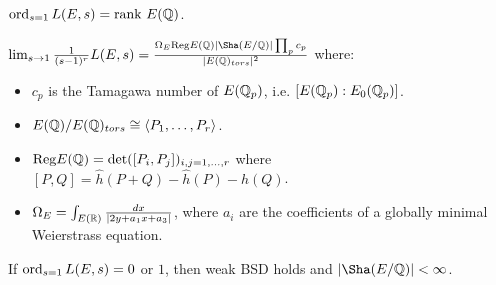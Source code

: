 \documentclass[10pt,a4paper]{article}
\begin{document}
\begin{conjecture}
  $\operatorname{ord}_{s=1} L(E,s) = \text{rank }E(\mathbb{Q})$.
\end{conjecture}

\begin{conjecture}
  $\lim_{s\to 1} \frac{1}{(s-1)^r}L(E,s) = \frac{\Omega_E \text{Reg}E(\Q)|\Sha(E/\Q)|\prod_p c_p}{|E(\Q)_{tors}|^2}$ where:
  \begin{itemize}
    \item $c_p$ is the Tamagawa number of $E(\mathbb{Q}_p)$, i.e. $[E(\mathbb{Q}_p):E_0(\mathbb{Q}_p)]$.
    \item $E(\mathbb{Q})/E(\mathbb{Q})_{tors} \cong \langle P_1, \ldots, P_r \rangle$.
    \item $\text{Reg}E(\mathbb{Q}) = \det([P_i,P_j])_{i,j=1,\ldots, r}$ where $[P,Q] = \hat{h}(P+Q)-\hat{h}(P)-\hat{h}(Q)$.
    \item $\Omega_E = \int_{E(\mathbb{R})}\frac{dx}{|2y+a_1 x+a_3|}$, where $a_i$ are the coefficients of a globally minimal Weierstrass equation.
  \end{itemize}
\end{conjecture}
\begin{theorem}[Kolyvagin]
  If $\operatorname{ord}_{s=1}L(E,s) = 0$ or $1$, then weak BSD holds and $|\Sha(E/\Q)| < \infty$.
\end{theorem}
\end{document}
